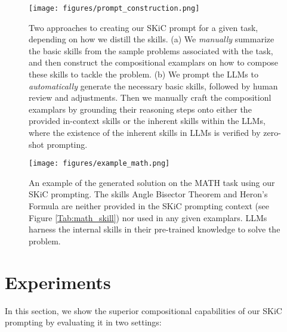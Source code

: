 \documentclass{article} \usepackage{arxiv}
\begin{document}
\begin{figure*}[t]
\begin{center}
\centerline{\texttt{[image: figures/prompt\_construction.png]}}
\caption{Two approaches to creating our SKiC prompt for a given task, depending on how we distill the skills. (a) We \emph{manually} summarize the basic skills from the sample problems associated with the task, and then construct the compositional examplars on how to compose these skills to tackle the problem. (b) We prompt the LLMs to \emph{automatically} generate the necessary basic skills, followed by human review and adjustments. Then we manually craft the compositionl examplars by grounding their reasoning steps onto either the provided in-context skills or the inherent skills within the LLMs, where the existence of the inherent skills in LLMs is verified by zero-shot prompting.
} 
\label{fig:construction}
\end{center}
\vskip -0.2in
\end{figure*}




\begin{figure*}[t]
\begin{center}
\centerline{\texttt{[image: figures/example\_math.png]}}
\caption{An example of the generated solution on the MATH task using our SKiC prompting. The skills  Angle Bisector Theorem and Heron's Formula are neither provided in the SKiC prompting context (see Figure \ref{Tab:math_skill}) nor used in any given examplars. LLMs harness the internal skills in their pre-trained knowledge to solve the problem.} \label{Tab:example_compose_math_skill_5}
\end{center}
\vskip -0.2in
\end{figure*}




















 
\section{Experiments}
\label{sec: experiments}
In this section, we show the superior compositional capabilities of our SKiC prompting by evaluating it in two settings:
\end{document}
